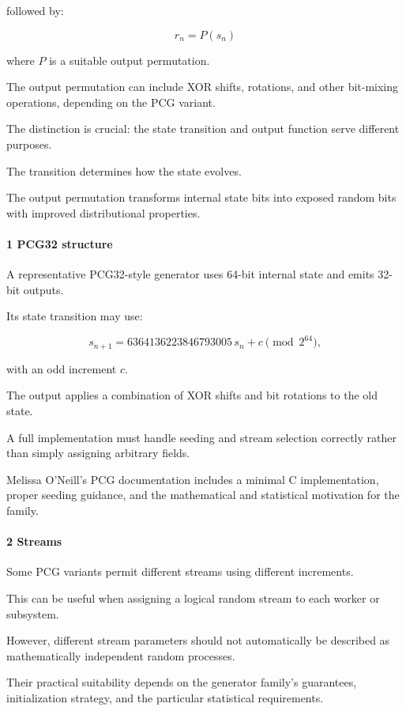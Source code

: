 followed by:

\[
 \boxed{ r_n=P(s_n) }
\]

where \(P\) is a suitable output permutation.

The output permutation can include XOR shifts, rotations, and other bit-mixing operations, depending on the PCG variant.

The distinction is crucial: the state transition and output function serve different purposes.

The transition determines how the state evolves.

The output permutation transforms internal state bits into exposed random bits with improved distributional properties.

\paragraph{1 PCG32 structure}\label{pcg32-structure}

A representative PCG32-style generator uses 64-bit internal state and emits 32-bit outputs.

Its state transition may use:

\[
 s_{n+1} = 6364136223846793005\,s_n+c \pmod{2^{64}},
\]

with an odd increment \(c\).

The output applies a combination of XOR shifts and bit rotations to the old state.

A full implementation must handle seeding and stream selection correctly rather than simply assigning arbitrary fields.

Melissa O'Neill's PCG documentation includes a minimal C implementation, proper seeding guidance, and the mathematical and statistical motivation for the family.

\paragraph{2 Streams}\label{streams}

Some PCG variants permit different streams using different increments.

This can be useful when assigning a logical random stream to each worker or subsystem.

However, different stream parameters should not automatically be described as mathematically independent random processes.

Their practical suitability depends on the generator family's guarantees, initialization strategy, and the particular statistical requirements.

